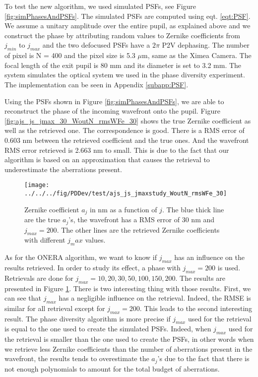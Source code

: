 To test the new algorithm, we used simulated PSFs, see Figure \ref{fig:simPhasesAndPSFs}. The simulated PSFs are computed using eqt. \eqref{eqt:PSF}. We assume a unitary amplitude over the entire pupil, as explained above and we construct the phase by attributing random values to Zernike coefficients from $j_{min}$ to $j_{max}$ and the two defocused PSFs have a $2\pi$ P2V dephasing. The number of pixel is N = 400 and the pixel size is 5.3 $\mu$m, same as the Ximea Camera. The focal length of the exit pupil is 80 mm and its diameter is set to 3.2 mm. The system simulates the optical system we used in the phase diversity experiment. The implementation can be seen in Appendix \ref{subapp:PSF}. 

Using the PSFs shown in Figure \ref{fig:simPhasesAndPSFs}, we are able to reconstruct the phase of the incoming wavefront onto the pupil. Figure \ref{fig:ajs_js_jmax_30_WoutN_rmsWFe_30} shows the true Zernike coefficient as well as the retrieved one. The correspondence is good. There is a RMS error of 0.603 nm between the retrieved coefficient and the true ones. And the wavefront RMS error retrieved is 2.663 nm to small. This is due to the fact that our algorithm is based on an approximation that causes the retrieval to underestimate the aberrations present.

\begin{figure}
\begin{center}
\texttt{[image: ../../../fig/PDDev/test/ajs\_js\_jmaxstudy\_WoutN\_rmsWFe\_30]}
\decoRule
\caption{Zernike coefficient $a_j$ in nm as a function of $j$. The blue thick line are the true $a_j$'s, the wavefront has a RMS error of 30 nm and $j_{max}= 200$. The other lines are the retrieved Zernike coefficients with different $j_max$ values.}
\label{fig:ajs_js_jmaxstudy_WoutN_rmsWFe_30}
\end{center}
\end{figure}

As for the ONERA algorithm, we want to know if $j_{max}$ has an influence on the results retrieved. In order to study its effect, a phase with $j_{max} = 200$ is used. Retrievals are done for $j_{max} = 10, 20 , 30, 50,100,150,200$. The results are presented in Figure \ref{fig:ajs_js_jmaxstudy_WoutN_rmsWFe_30}. There is two interesting thing with those results. First, we can see that $j_{max}$ has a negligible influence on the retrieval. Indeed, the RMSE is similar for all retrieval except for $j_{max} = 200$. This leads to the second interesting result. The phase diversity algorithm is more precise if $j_{max}$ used for the retrieval is equal to the one used to create the simulated PSFs. Indeed, when $j_{max}$ used for the retrieval is smaller than the one used to create the PSFs, in other words when we retrieve less Zernike coefficients than the number of aberrations present in the wavefront, the results tends to overestimate the $a_j$'s due to the fact that there is not enough polynomials to amount for the total budget of aberrations.

